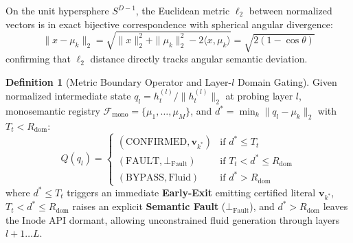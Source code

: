 \documentclass[10pt,twocolumn]{article}
\theoremstyle{definition}
\newtheorem{definition}{Definition}
\begin{document}
On the unit hypersphere $S^{D-1}$, the Euclidean metric $\ell_2$ between normalized vectors is in exact bijective correspondence with spherical angular divergence:
\begin{equation}
    \|x - \mu_k\|_2 = \sqrt{\|x\|_2^2 + \|\mu_k\|_2^2 - 2 \langle x, \mu_k \rangle} = \sqrt{2(1 - \cos\theta)}
\end{equation}
confirming that $\ell_2$ distance directly tracks angular semantic deviation.

\begin{definition}[Metric Boundary Operator and Layer-$l$ Domain Gating]
Given normalized intermediate state $q_l = h_t^{(l)} / \|h_t^{(l)}\|_2$ at probing layer $l$, monosemantic registry $\mathcal{F}_{\mathrm{mono}} = \{\mu_1, \dots, \mu_M\}$, and $d^* = \min_k \|q_l - \mu_k\|_2$ with $T_t < R_{\mathrm{dom}}$:
{\small
\begin{equation}
    Q(q_l) = 
    \begin{cases} 
      (\mathrm{CONFIRMED}, \mathbf{v}_{k^*}) & \text{if } d^* \le T_t \\ 
      (\mathrm{FAULT}, \bot_{\mathrm{Fault}}) & \text{if } T_t < d^* \le R_{\mathrm{dom}} \\
      (\mathrm{BYPASS}, \mathrm{Fluid}) & \text{if } d^* > R_{\mathrm{dom}}
    \end{cases}
    \label{eq:query_operator}
\end{equation}
}
where $d^* \le T_t$ triggers an immediate \textbf{Early-Exit} emitting certified literal $\mathbf{v}_{k^*}$, $T_t < d^* \le R_{\mathrm{dom}}$ raises an explicit \textbf{Semantic Fault} ($\bot_{\mathrm{Fault}}$), and $d^* > R_{\mathrm{dom}}$ leaves the Inode API dormant, allowing unconstrained fluid generation through layers $l+1 \dots L$.
\end{definition}
\end{document}
